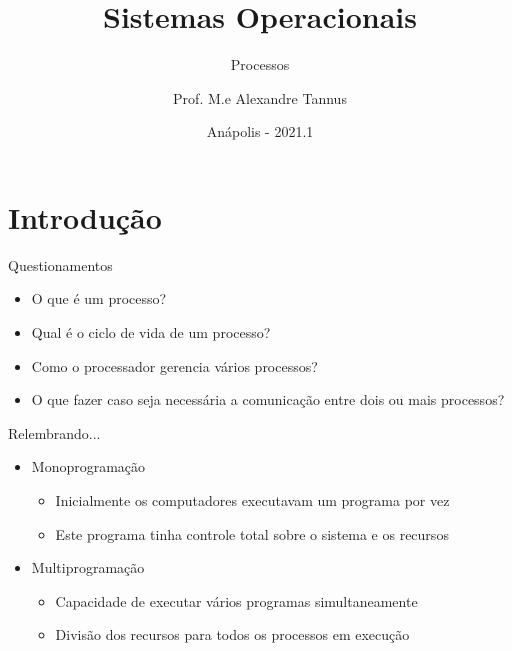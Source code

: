 \documentclass[aspectratio=169,
				xcolor=table]{beamer}
\institute[]{\uppercase{Engenharia de Software}}
\title[]{Sistemas Operacionais}
\subtitle[]{Processos}
\author[]{Prof. M.e Alexandre Tannus}
\date{Anápolis - 2021.1}
\begin{document}
	\begin{frame}
		\titlepage
	\end{frame}

	\begin{frame}
		\tableofcontents
	\end{frame}	
	
	\section{Introdução}
	
	\begin{frame}{Questionamentos}
	\begin{itemize}
		\item O que é um processo?
		\vspace{1em}
		\item Qual é o ciclo de vida de um processo?
		\vspace{1em}
		\item Como o processador gerencia vários processos?
		\vspace{1em}
		\item O que fazer caso seja necessária a comunicação entre dois ou mais processos?
	\end{itemize}
	\end{frame}
	
	\begin{frame}{Relembrando...}
		\begin{itemize}
			\item Monoprogramação
			\begin{itemize}
				\item Inicialmente os computadores executavam um programa por vez
				\item Este programa tinha controle total sobre o sistema e os recursos
			
			\end{itemize}
			\vspace{1em}
			\item Multiprogramação
			\begin{itemize}
				\item Capacidade de executar vários programas simultaneamente
				\item Divisão dos recursos para todos os processos em execução
			\end{itemize}
		\end{itemize}
	\end{frame}
	
\end{document}
